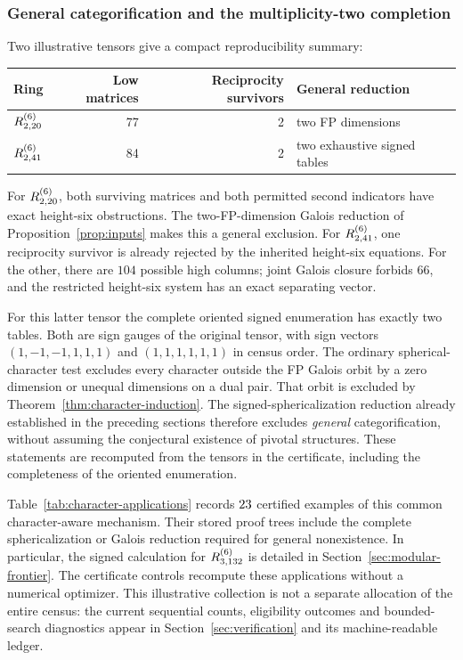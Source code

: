 \subsubsection{General categorification and the multiplicity-two completion}
Two illustrative tensors give a compact reproducibility summary:
\begin{center}
\begin{tabular}{lrrl}\toprule
Ring & Low matrices & Reciprocity survivors & General reduction\\\midrule
$R^{(6)}_{2,20}$ & 77 & 2 & two FP dimensions\\
$R^{(6)}_{2,41}$ & 84 & 2 & two exhaustive signed tables\\\bottomrule
\end{tabular}
\end{center}
For $R^{(6)}_{2,20}$, both surviving matrices and both permitted second
indicators have exact height-six obstructions. The two-FP-dimension
Galois reduction of Proposition~\ref{prop:inputs} makes this a general
exclusion. For $R^{(6)}_{2,41}$, one reciprocity survivor is already rejected
by the inherited height-six equations. For the other, there are $104$
possible high columns; joint Galois closure forbids $66$, and the
restricted height-six system has an exact separating vector.

For this latter tensor the complete oriented signed enumeration has
exactly two tables. Both are sign gauges of the original tensor, with
sign vectors $(1,-1,-1,1,1,1)$ and $(1,1,1,1,1,1)$ in census order.
The ordinary spherical-character test excludes every character outside
the FP Galois orbit by a zero dimension or unequal dimensions on a dual
pair. That orbit is excluded by Theorem~\ref{thm:character-induction}.
The signed-sphericalization reduction already established in the
preceding sections therefore excludes \emph{general} categorification,
without assuming the conjectural existence of pivotal structures.
These statements are recomputed from the tensors in the certificate,
including the completeness of the oriented enumeration.

Table~\ref{tab:character-applications} records $23$ certified examples
of this common character-aware mechanism. Their stored proof trees
include the complete sphericalization or Galois reduction required for
general nonexistence. In particular, the signed calculation for
$R^{(6)}_{3,132}$ is detailed in Section~\ref{sec:modular-frontier}.
The certificate controls recompute these applications without a
numerical optimizer. This illustrative collection is not a separate
allocation of the entire census: the current sequential counts,
eligibility outcomes and bounded-search diagnostics appear in
Section~\ref{sec:verification} and its machine-readable ledger.

